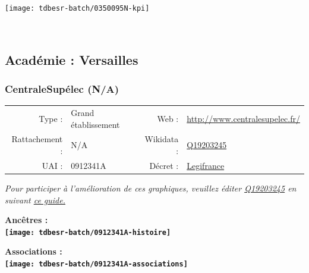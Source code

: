 \documentclass[12pt,french,]{article}
\begin{document}
\begin{center}\texttt{[image: tdbesr-batch/0350095N-kpi]} \end{center}\checkoddpage

\ifoddpage ~\newpage \fi   

\hypertarget{acaduxe9mie-versailles-1}{%
\subsection{Académie : Versailles}\label{acaduxe9mie-versailles-1}}

\hypertarget{centralesupuxe9lec-na}{%
\subsubsection{CentraleSupélec (N/A)}\label{centralesupuxe9lec-na}}

\begin{tabular*}{\textwidth}{rp{5cm}rl}  
\hline  
Type : & Grand établissement & Web : &\href{http://www.centralesupelec.fr/}{http://www.centralesupelec.fr/} \\  
Rattachement : & N/A & Wikidata : & \href{https://www.wikidata.org/entity/Q19203245}{Q19203245} \\  
UAI : & 0912341A & Décret : & \href{http://legifrance.gouv.fr/affichTexte.do?cidTexte=JORFTEXT000030001939&dateTexte=&categorieLien=id}{Legifrance} \\  
\hline  
\end{tabular*}

\textit{\scriptsize Pour participer à l'amélioration de ces graphiques, veuillez éditer  \href{https://www.wikidata.org/entity/Q19203245}{Q19203245}  en suivant \href{https://github.com/cpesr/wikidataESR/blob/master/Rmd/wikidataESR.md}{ce guide.}}

\vspace{1cm}  
\begin{minipage}[b]{0.50\textwidth}\begin{center} \bf Ancêtres : \\  
\texttt{[image: tdbesr-batch/0912341A-histoire]} \end{center}\end{minipage}\begin{minipage}[b]{0.50\textwidth}\begin{center} \bf Associations : \\  
\texttt{[image: tdbesr-batch/0912341A-associations]} \end{center}\end{minipage}
\end{document}
